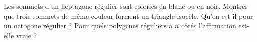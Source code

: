 Les sommets d'un heptagone régulier sont coloriés en blanc ou en noir. Montrer que trois sommets de même couleur forment un triangle isocèle. Qu'en est-il pour un octogone régulier ? Pour quels polygones réguliers à $n$ côtés l'affirmation est-elle vraie ?
